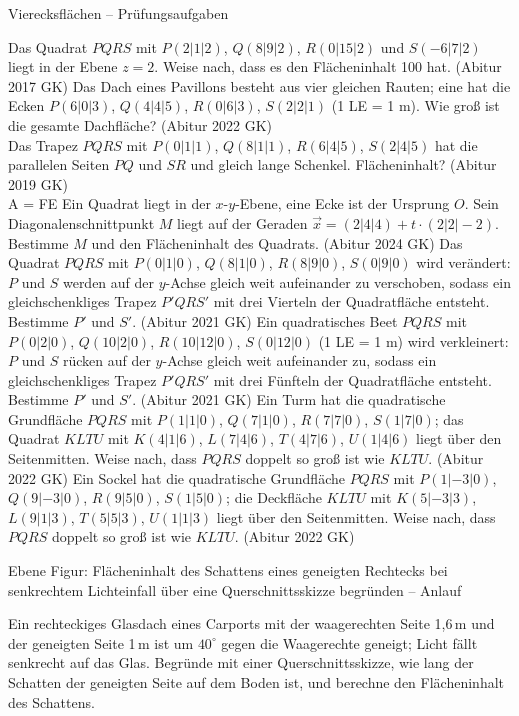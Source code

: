 \begin{aufgabe}{Vierecksflächen – Prüfungsaufgaben}
\begin{teile}
\teil Das Quadrat $PQRS$ mit $P(2 | 1 | 2)$, $Q(8 | 9 | 2)$, $R(0 | 15 | 2)$ und $S(-6 | 7 | 2)$ liegt in der Ebene $z = 2$. Weise nach, dass es den Flächeninhalt 100 hat. \hfill (Abitur 2017 GK)
\teil Das Dach eines Pavillons besteht aus vier gleichen Rauten; eine hat die Ecken $P(6 | 0 | 3)$, $Q(4 | 4 | 5)$, $R(0 | 6 | 3)$, $S(2 | 2 | 1)$ (1 LE = 1 m). Wie groß ist die gesamte Dachfläche? \hfill (Abitur 2022 GK) \\ \leerfeld[m²]
\teil Das Trapez $PQRS$ mit $P(0 | 1 | 1)$, $Q(8 | 1 | 1)$, $R(6 | 4 | 5)$, $S(2 | 4 | 5)$ hat die parallelen Seiten $PQ$ und $SR$ und gleich lange Schenkel. Flächeninhalt? \hfill (Abitur 2019 GK) \\ A = \leerfeld FE
\teil Ein Quadrat liegt in der $x$-$y$-Ebene, eine Ecke ist der Ursprung $O$. Sein Diagonalenschnittpunkt $M$ liegt auf der Geraden $\vec x = (2 | 4 | 4) + t \cdot (2 | 2 | -2)$. Bestimme $M$ und den Flächeninhalt des Quadrats. \hfill (Abitur 2024 GK)
\teil Das Quadrat $PQRS$ mit $P(0 | 1 | 0)$, $Q(8 | 1 | 0)$, $R(8 | 9 | 0)$, $S(0 | 9 | 0)$ wird verändert: $P$ und $S$ werden auf der $y$-Achse gleich weit aufeinander zu verschoben, sodass ein gleichschenkliges Trapez $P'QRS'$ mit drei Vierteln der Quadratfläche entsteht. Bestimme $P'$ und $S'$. \hfill (Abitur 2021 GK)
\teil Ein quadratisches Beet $PQRS$ mit $P(0 | 2 | 0)$, $Q(10 | 2 | 0)$, $R(10 | 12 | 0)$, $S(0 | 12 | 0)$ (1 LE = 1 m) wird verkleinert: $P$ und $S$ rücken auf der $y$-Achse gleich weit aufeinander zu, sodass ein gleichschenkliges Trapez $P'QRS'$ mit drei Fünfteln der Quadratfläche entsteht. Bestimme $P'$ und $S'$. \hfill (Abitur 2021 GK)
\teil Ein Turm hat die quadratische Grundfläche $PQRS$ mit $P(1 | 1 | 0)$, $Q(7 | 1 | 0)$, $R(7 | 7 | 0)$, $S(1 | 7 | 0)$; das Quadrat $KLTU$ mit $K(4 | 1 | 6)$, $L(7 | 4 | 6)$, $T(4 | 7 | 6)$, $U(1 | 4 | 6)$ liegt über den Seitenmitten. Weise nach, dass $PQRS$ doppelt so groß ist wie $KLTU$. \hfill (Abitur 2022 GK)
\teil Ein Sockel hat die quadratische Grundfläche $PQRS$ mit $P(1 | -3 | 0)$, $Q(9 | -3 | 0)$, $R(9 | 5 | 0)$, $S(1 | 5 | 0)$; die Deckfläche $KLTU$ mit $K(5 | -3 | 3)$, $L(9 | 1 | 3)$, $T(5 | 5 | 3)$, $U(1 | 1 | 3)$ liegt über den Seitenmitten. Weise nach, dass $PQRS$ doppelt so groß ist wie $KLTU$. \hfill (Abitur 2022 GK)
\end{teile}
\end{aufgabe}

\begin{aufgabe}{Ebene Figur: Flächeninhalt des Schattens eines geneigten Rechtecks bei senkrechtem Lichteinfall über eine Querschnittsskizze begründen – Anlauf}
\begin{teile}
\teil Ein rechteckiges Glasdach eines Carports mit der waagerechten Seite 1{,}6\,m und der geneigten Seite 1\,m ist um $40^\circ$ gegen die Waagerechte geneigt; Licht fällt senkrecht auf das Glas. Begründe mit einer Querschnittsskizze, wie lang der Schatten der geneigten Seite auf dem Boden ist, und berechne den Flächeninhalt des Schattens.
\end{teile}
\end{aufgabe}

